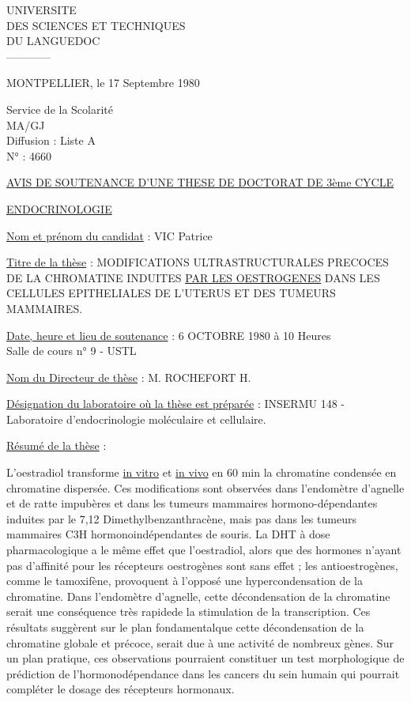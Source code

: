 UNIVERSITE\\
DES SCIENCES ET TECHNIQUES\\
DU LANGUEDOC\\
------------

MONTPELLIER, le 17 Septembre 1980

Service de la Scolarité\\
MA/GJ\\
Diffusion : Liste A\\
N° : 4660

\uline{AVIS DE SOUTENANCE D'UNE THESE DE DOCTORAT DE 3ème CYCLE}

\uline{ENDOCRINOLOGIE}

\uline{Nom et prénom du candidat} : VIC Patrice

\uline{Titre de la thèse} : MODIFICATIONS ULTRASTRUCTURALES PRECOCES DE LA CHROMATINE INDUITES \uline{PAR LES OESTROGENES} DANS LES CELLULES EPITHELIALES DE L'UTERUS ET DES TUMEURS MAMMAIRES.

\uline{Date, heure et lieu de soutenance} : 6 OCTOBRE 1980 à 10 Heures\\
Salle de cours n° 9 - USTL

\uline{Nom du Directeur de thèse} : M. ROCHEFORT H.

\uline{Désignation du laboratoire où la thèse est préparée} : INSERMU 148 - Laboratoire d'endocrinologie moléculaire et cellulaire.

\uline{Résumé de la thèse} :

L'oestradiol transforme \uline{in vitro} et \uline{in vivo} en 60 min la chromatine condensée en chromatine dispersée. Ces modifications sont observées dans l'endomètre d'agnelle et de ratte impubères et dans les tumeurs mammaires hormono-dépendantes induites par le 7,12 Dimethylbenzanthracène, mais pas dans les tumeurs mammaires C3H hormonoindépendantes de souris. La DHT à dose pharmacologique a le même effet que l'oestradiol, alors que des hormones n'ayant pas d'affinité pour les récepteurs oestrogènes sont sans effet ; les antioestrogènes, comme le tamoxifène, provoquent à l'opposé une hypercondensation de la chromatine. Dans l'endomètre d'agnelle, cette décondensation de la chromatine serait une conséquence très rapidede la stimulation de la transcription. Ces résultats suggèrent sur le plan fondamental\unsure{:}que cette décondensation de la chromatine globale et précoce, serait due à une activité de nombreux gènes. Sur un plan pratique, ces observations pourraient constituer un test morphologique de prédiction de l'hormonodépendance dans les cancers du sein humain qui pourrait compléter le dosage des récepteurs hormonaux.

